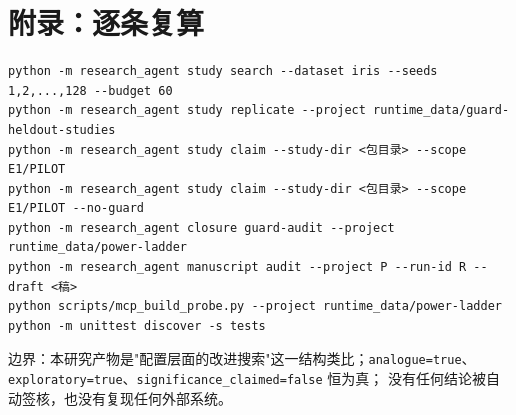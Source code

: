 \documentclass[11pt,a4paper]{ctexart}
\begin{document}
\section*{附录：逐条复算}
\vspace{-0.6em}
\begin{verbatim}
python -m research_agent study search --dataset iris --seeds 1,2,...,128 --budget 60
python -m research_agent study replicate --project runtime_data/guard-heldout-studies
python -m research_agent study claim --study-dir <包目录> --scope E1/PILOT
python -m research_agent study claim --study-dir <包目录> --scope E1/PILOT --no-guard
python -m research_agent closure guard-audit --project runtime_data/power-ladder
python -m research_agent manuscript audit --project P --run-id R --draft <稿>
python scripts/mcp_build_probe.py --project runtime_data/power-ladder
python -m unittest discover -s tests
\end{verbatim}

\begin{center}
\small 边界：本研究产物是"配置层面的改进搜索"这一结构类比；\texttt{analogue=true}、
\texttt{exploratory=true}、\texttt{significance\_claimed=false} 恒为真；
没有任何结论被自动签核，也没有复现任何外部系统。
\end{center}
\end{document}

